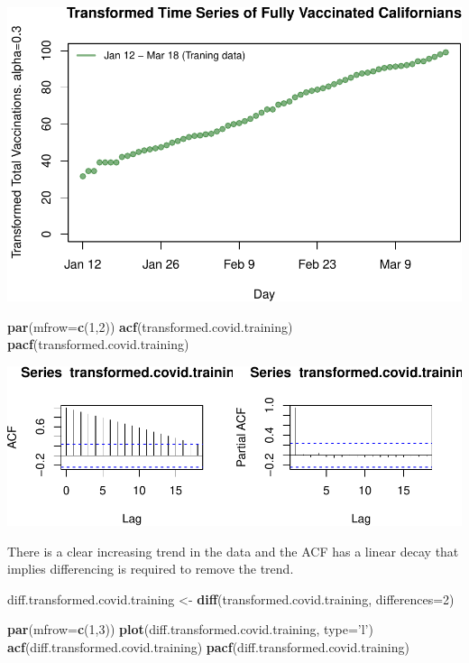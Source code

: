\documentclass[]{article}
\newenvironment{Shaded}{\begin{snugshade}}{\end{snugshade}}
\newcommand{\DataTypeTok}[1]{\textcolor[rgb]{0.13,0.29,0.53}{#1}}
\newcommand{\DecValTok}[1]{\textcolor[rgb]{0.00,0.00,0.81}{#1}}
\newcommand{\KeywordTok}[1]{\textcolor[rgb]{0.13,0.29,0.53}{\textbf{#1}}}
\newcommand{\NormalTok}[1]{#1}
\newcommand{\StringTok}[1]{\textcolor[rgb]{0.31,0.60,0.02}{#1}}
\begin{document}
\begin{center}\includegraphics{Q5_files/figure-latex/unnamed-chunk-6-1} \end{center}

\begin{Shaded}
\begin{Highlighting}[]
\KeywordTok{par}\NormalTok{(}\DataTypeTok{mfrow=}\KeywordTok{c}\NormalTok{(}\DecValTok{1}\NormalTok{,}\DecValTok{2}\NormalTok{))}
\KeywordTok{acf}\NormalTok{(transformed.covid.training)}
\KeywordTok{pacf}\NormalTok{(transformed.covid.training)}
\end{Highlighting}
\end{Shaded}

\begin{center}\includegraphics{Q5_files/figure-latex/unnamed-chunk-7-1} \end{center}

There is a clear increasing trend in the data and the ACF has a linear
decay that implies differencing is required to remove the trend.

\begin{Shaded}
\begin{Highlighting}[]
\NormalTok{diff.transformed.covid.training <-}\StringTok{ }\KeywordTok{diff}\NormalTok{(transformed.covid.training, }\DataTypeTok{differences=}\DecValTok{2}\NormalTok{)}

\KeywordTok{par}\NormalTok{(}\DataTypeTok{mfrow=}\KeywordTok{c}\NormalTok{(}\DecValTok{1}\NormalTok{,}\DecValTok{3}\NormalTok{))}
\KeywordTok{plot}\NormalTok{(diff.transformed.covid.training, }\DataTypeTok{type=}\StringTok{'l'}\NormalTok{)}
\KeywordTok{acf}\NormalTok{(diff.transformed.covid.training)}
\KeywordTok{pacf}\NormalTok{(diff.transformed.covid.training)}
\end{Highlighting}
\end{Shaded}
\end{document}
